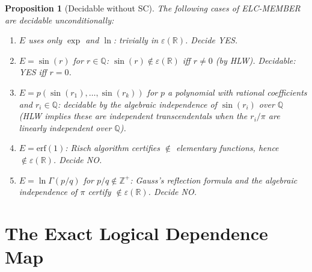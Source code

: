 \documentclass[11pt]{article}
\newtheorem{proposition}[theorem]{Proposition}
\begin{document}
\begin{proposition}[Decidable without SC]
The following cases of ELC-MEMBER are decidable unconditionally:
\begin{enumerate}
  \item $E$ uses only $\exp$ and $\ln$: trivially in $\varepsilon(\mathbb{R})$. Decide YES.
  \item $E=\sin(r)$ for $r\in\mathbb{Q}$: $\sin(r)\notin\varepsilon(\mathbb{R})$ iff $r\neq0$
    (by HLW). Decidable: YES iff $r=0$.
  \item $E=p(\sin(r_1),\ldots,\sin(r_k))$ for $p$ a polynomial with rational coefficients
    and $r_i\in\mathbb{Q}$: decidable by the algebraic independence of $\sin(r_i)$ over $\mathbb{Q}$
    (HLW implies these are independent transcendentals when the $r_i/\pi$ are linearly
    independent over $\mathbb{Q}$).
  \item $E=\mathrm{erf}(1)$: Risch algorithm certifies $\notin$ elementary functions,
    hence $\notin\varepsilon(\mathbb{R})$. Decide NO.
  \item $E=\ln\Gamma(p/q)$ for $p/q\notin\mathbb{Z}^+$: Gauss's reflection formula and
    the algebraic independence of $\pi$ certify $\notin\varepsilon(\mathbb{R})$. Decide NO.
\end{enumerate}
\end{proposition}

\section{The Exact Logical Dependence Map}
\end{document}
